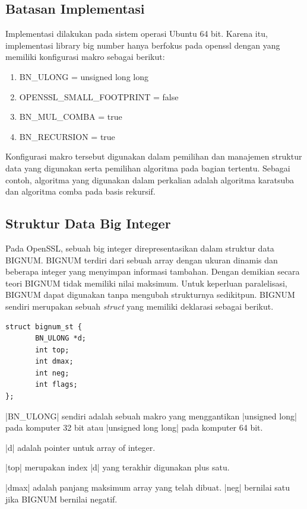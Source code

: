 \subsection{Batasan Implementasi}
Implementasi dilakukan pada sistem operasi Ubuntu 64 bit. Karena itu, implementasi library big number hanya berfokus pada openssl dengan yang memiliki konfigurasi makro sebagai berikut:
\begin{enumerate}[label=\roman*.]
  \item BN\_ULONG = unsigned long long
  \item OPENSSL\_SMALL\_FOOTPRINT = false
  \item BN\_MUL\_COMBA = true
  \item BN\_RECURSION = true

\end{enumerate}

Konfigurasi makro tersebut digunakan dalam pemilihan dan manajemen struktur data yang digunakan serta pemilihan algoritma pada bagian tertentu. Sebagai contoh, algoritma yang digunakan dalam perkalian adalah algoritma karatsuba dan algoritma comba pada basis rekursif.

\subsection{Struktur Data Big Integer} \label{sec:bignum_struct}
Pada OpenSSL, sebuah big integer direpresentasikan dalam struktur data BIGNUM. BIGNUM terdiri dari sebuah array dengan ukuran dinamis dan beberapa integer yang menyimpan informasi tambahan. Dengan demikian secara teori BIGNUM tidak memiliki nilai maksimum. Untuk keperluan paralelisasi, BIGNUM dapat digunakan tanpa mengubah strukturnya sedikitpun. BIGNUM sendiri merupakan sebuah \textit{struct} yang memiliki deklarasi sebagai berikut.

\begin{lstlisting}[caption=Struktur Data bignum]
struct bignum_st {
       BN_ULONG *d;
       int top;
       int dmax;
       int neg;
       int flags;
};
\end{lstlisting}

|BN_ULONG| sendiri adalah sebuah makro yang menggantikan |unsigned long| pada komputer 32 bit atau |unsigned long long| pada komputer 64 bit.

|d| adalah pointer untuk array of integer.

|top| merupakan index |d| yang terakhir digunakan plus satu.

|dmax| adalah panjang maksimum array yang telah dibuat. |neg| bernilai satu jika BIGNUM bernilai negatif.

